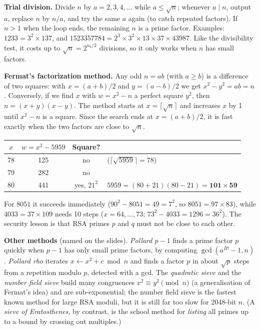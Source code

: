 \textbf{Trial division.} Divide $n$ by $a = 2, 3, 4, \dots$ while $a \le \sqrt n$; whenever $a \mid n$, output $a$, replace $n$ by $n/a$, and try the same $a$ again (to catch repeated factors). If $n > 1$ when the loop ends, the remaining $n$ is a prime factor. Examples: $1233 = 3^2 \times 137$, and $1523357784 = 2^3 \times 3^2 \times 13 \times 37 \times 43987$. Like the divisibility test, it costs up to $\sqrt n = 2^{n_b/2}$ divisions, so it only works when $n$ has small factors.

\textbf{Fermat's factorization method.} Any odd $n = ab$ (with $a \ge b$) is a difference of two squares: with $x = (a + b)/2$ and $y = (a - b)/2$ we get $x^2 - y^2 = ab = n$. Conversely, if we find $x$ with $w = x^2 - n$ a perfect square $y^2$, then $n = (x + y)(x - y)$. The method starts at $x = \lceil\sqrt n\rceil$ and increases $x$ by 1 until $x^2 - n$ is a square. Since the search ends at $x = (a + b)/2$, it is fast exactly when the two factors are close to $\sqrt n$.
\begin{center}\small
\begin{tabular}{@{}cccl@{}}
\toprule
$x$ & $w = x^2 - 5959$ & Square? & \\
\midrule
78 & 125 & no & ($\lceil\sqrt{5959}\rceil = 78$)\\
79 & 282 & no & \\
80 & 441 & yes, $21^2$ & $5959 = (80 + 21)(80 - 21) = \mathbf{101 \times 59}$\\
\bottomrule
\end{tabular}
\end{center}
For $8051$ it succeeds immediately ($90^2 - 8051 = 49 = 7^2$, so $8051 = 97 \times 83$), while $4033 = 37 \times 109$ needs 10 steps ($x = 64, \dots, 73$; $73^2 - 4033 = 1296 = 36^2$). The security lesson is that RSA primes $p$ and $q$ must not be close to each other.

\textbf{Other methods} (named on the slides). \emph{Pollard $p - 1$} finds a prime factor $p$ quickly when $p - 1$ has only small prime factors, by computing $\gcd(a^{B!} - 1, n)$. \emph{Pollard rho} iterates $x \leftarrow x^2 + c \bmod n$ and finds a factor $p$ in about $\sqrt p$ steps from a repetition modulo $p$, detected with a gcd. The \emph{quadratic sieve} and the \emph{number field sieve} build many congruences $x^2 \equiv y^2 \pmod n$ (a generalisation of Fermat's idea) and are sub-exponential; the number field sieve is the fastest known method for large RSA moduli, but it is still far too slow for 2048-bit $n$. (A \emph{sieve of Eratosthenes}, by contrast, is the school method for \emph{listing} all primes up to a bound by crossing out multiples.)

